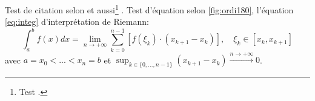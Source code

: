 \documentclass[a4paper,12pt]{article}
\begin{document}
	Test de citation selon \cite{AbedonHymanThomas2003} et aussi\footnote{Test \cite{Nobody06}.} \cite{Abedon1994}.
	Test d'équation selon \ref{fig:ordi180}, l'équation \eqref{eq:integ} d'interprétation de Riemann:
	\begin{equation}
		\int_a^bf(x)dx = \lim_{n\rightarrow + \infty}\sum_{k=0}^{n-1}\left[ f\left(\xi_k\right)\cdot (x_{k+1}-x_k)\right], \quad\xi_k \in [x_k, x_{k+1}]  \label{eq:integ}
	\end{equation}
	avec $a = x_0 < ... < x_n = b$ et $\sup_{k \in \{0,...,  n-1\}}( x_{k+1}-x_{k}) \overset{n \rightarrow + \infty}{\longrightarrow} 0$.

\newpage
\fancyhead[L]{}


\end{document}
